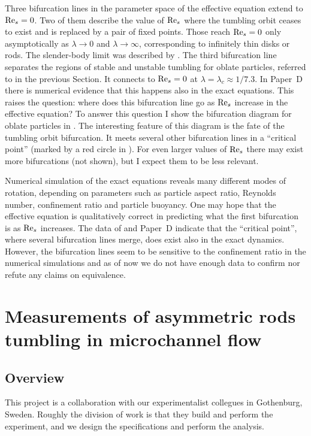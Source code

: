 \documentclass[thesis.tex]{subfiles}
\begin{document}
Three bifurcation lines in the parameter space of the effective equation extend to $\textrm{Re}_s=0$. Two of them describe the value of $\textrm{Re}_s$ where the tumbling orbit ceases to exist and is replaced by a pair of fixed points. Those reach $\textrm{Re}_s=0$ only asymptotically as $\lambda\to0$ and $\lambda\to\infty$, corresponding to infinitely thin disks or rods. The slender-body limit was described by \citet{subramanian2005}. The third bifurcation line separates the regions of stable and unstable tumbling for oblate particles, referred to in the previous Section. It connects to $\textrm{Re}_s=0$ at $\lambda=\lambda_c\approx1/7.3$. In Paper~D there is numerical evidence that this happens also in the exact equations. This raises the question: where does this bifurcation line go as $\textrm{Re}_s$ increase in the effective equation?
To answer this question I show the bifurcation diagram for oblate particles in . The interesting feature of this diagram is the fate of the tumbling orbit bifurcation. It meets several other bifurcation lines in a ``critical point'' (marked by a red circle in ). For even larger values of $\textrm{Re}_s$ there may exist more bifurcations (not shown), but I expect them to be less relevant.

Numerical simulation of the exact equations reveals many different modes of rotation, depending on parameters such as particle aspect ratio, Reynolds number, confinement ratio and particle buoyancy. One may hope that the effective equation is qualitatively correct in predicting what the first bifurcation is as $\textrm{Re}_s$ increases. The data of \citet{rosen2015b} and Paper~D indicate that the ``critical point'', where several bifurcation lines merge, does exist also in the exact dynamics. However, the bifurcation lines seem to be sensitive to the confinement ratio in the numerical simulations and as of now we do not have enough data to confirm nor refute any claims on equivalence.

\raggedbottom\makeatletter
\afterpage{\global\let\@textbottom\relax \global\let\@texttop\relax}

\chapter[Measurements of asymmetric rods]{Measurements of asymmetric rods tumbling in microchannel flow}
\section{Overview}
This project is a collaboration with our experimentalist collegues in Gothenburg, Sweden. Roughly the division of work is that they build and perform the experiment, and we design the specifications and perform the analysis.
\end{document}
